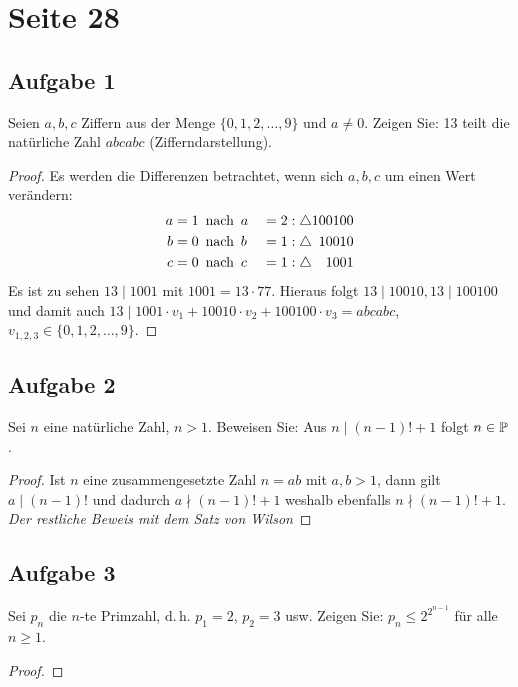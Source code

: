 \section{Seite 28}

\subsection{Aufgabe 1}
Seien $a,b,c$ Ziffern aus der Menge $\{0,1,2,\dotsc,9\}$ und $a \neq 0$.
Zeigen Sie: 13 teilt die natürliche Zahl $abcabc$ (Zifferndarstellung).
\begin{proof}
  Es werden die Differenzen betrachtet, wenn sich $a, b, c$ um einen Wert verändern:
  \begin{alignat*}{2}
    a & = 1 \enspace\text{nach}\enspace a &  & = 2 : \triangle 100100            \\
    b & = 0 \enspace\text{nach}\enspace b &  & = 1 : \triangle \hphantom{0}10010 \\
    c & = 0 \enspace\text{nach}\enspace c &  & = 1 : \triangle \hphantom{00}1001
  \end{alignat*}
  Es ist zu sehen $13 \mid 1001$ mit $1001 = 13 \cdot 77$.
  Hieraus folgt $13 \mid 10010, 13 \mid 100100$ und damit auch
  $13 \mid 1001 \cdot v_1 + 10010 \cdot v_2 + 100100 \cdot v_3 = abcabc$, $v_{1,2,3} \in \{0,1,2,\dotsc,9\}$.
\end{proof}

\newpage
\subsection{Aufgabe 2}
Sei $n$ eine natürliche Zahl, $n > 1$. Beweisen Sie: Aus $n \mid (n - 1)! + 1$
folgt $n \in \mathbb{P}$.
\begin{proof}
  Ist $n$ eine zusammengesetzte Zahl $n = ab$ mit $a,b > 1$, dann gilt
  $a \mid (n - 1)!$ und dadurch $a \nmid (n - 1)! + 1$ weshalb ebenfalls
  $n \nmid (n - 1)! + 1$. \\[4pt]
  \emph{Der restliche Beweis mit dem Satz von Wilson}
\end{proof}

\newpage
\subsection{Aufgabe 3}
Sei $p_n$ die $n$-te Primzahl, d.\,h. $p_1 = 2$, $p_2 = 3$ usw. Zeigen Sie:
$p_n \leq 2^{2^{n - 1}}$ für alle $n \geq 1$.
\begin{proof}
\end{proof}

